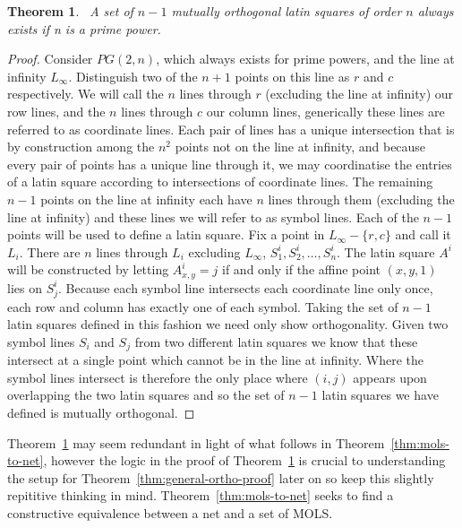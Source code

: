 \documentclass{article}
\newtheorem{theorem}{Theorem}
\begin{document}
\begin{theorem}~\label{thm:mols}
  A set of \(n - 1\) mutually orthogonal latin squares of order \(n\) always exists if n is a prime power.
\end{theorem}
\begin{proof}
  Consider \(PG(2, n)\), which always exists for prime powers, and the line at infinity \(L_{\infty}\). Distinguish two of the \(n + 1\) points on this line as \(r\) and \(c\) respectively.
  We will call the \(n\) lines through \(r\) (excluding the line at infinity) our row lines, and the \(n\) lines through \(c\) our column lines, generically these lines are referred to as coordinate lines.
  Each pair of lines has a unique intersection that is by construction among the \(n^2\) points not on the line at infinity, and because every pair of points has a unique line through it, we may coordinatise the entries of a latin square according to intersections of coordinate lines.
  The remaining \(n - 1\) points on the line at infinity each have \(n\) lines through them (excluding the line at infinity) and these lines we will refer to as symbol lines. Each of the \(n - 1\) points will be used to define a latin square. Fix a point in \(L_{\infty} - \{r, c\}\) and call it \(L_i\). There are \(n\) lines through \(L_{i}\) excluding \(L_{\infty}\), \(S_{1}^{i}, S_{2}^{i}, \ldots, S^{i}_{n}\).
  The latin square \(A^{i}\) will be constructed by letting \(A^{i}_{x,y} = j\) if and only if the affine point \((x, y, 1)\) lies on \(S^{i}_{j}\). Because each symbol line intersects each coordinate line only once, each row and column has exactly one of each symbol.
  Taking the set of \(n - 1\) latin squares defined in this fashion we need only show orthogonality. Given two symbol lines \(S_i\) and \(S_j\) from two different latin squares we know that these intersect at a single point which cannot be in the line at infinity.
  Where the symbol lines intersect is therefore the only place where \((i, j)\) appears upon overlapping the two latin squares and so the set of \(n - 1\) latin squares we have defined is mutually orthogonal.
\end{proof}


Theorem~\ref{thm:mols} may seem redundant in light of what follows in Theorem~\ref{thm:mols-to-net}, however the logic in the proof of Theorem~\ref{thm:mols} is crucial to understanding the setup for Theorem~\ref{thm:general-ortho-proof} later on so keep this slightly repititive thinking in mind.
Theorem~\ref{thm:mols-to-net} seeks to find a constructive equivalence between a net and a set of MOLS.
\end{document}
